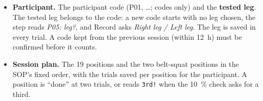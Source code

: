 \documentclass[a4paper,10pt]{article}
\newcommand{\code}[1]{\texttt{#1}}
\begin{document}
\begin{itemize}
\item \textbf{Participant.} The participant code (P01, \dots; codes only) and the \textbf{tested leg}. The tested leg belongs to the
  code: a new code starts with no leg chosen, the step reads \emph{P05: leg?}, and Record asks \emph{Right leg / Left leg}. The leg is saved
  in every trial. A code kept from the previous session (within 12~h) must be confirmed before it counts.
\item \textbf{Session plan.} The 19 positions and the two belt-squat positions in the SOP's fixed order, with the trials saved per
  position for the participant. A position is ``done'' at two trials, or reads \code{3rd!} when the 10~\% check asks for a third.
\end{itemize}
\end{document}
